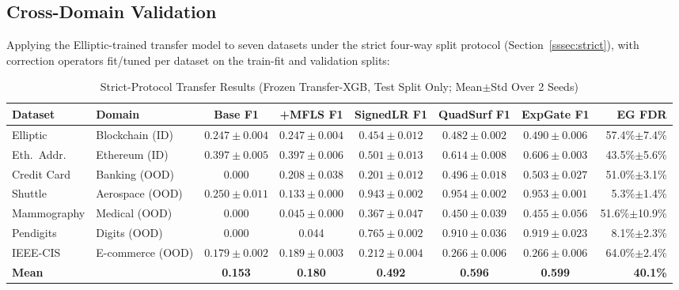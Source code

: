 \documentclass[journal]{IEEEtran}
\begin{document}
\subsection{Cross-Domain Validation}
\label{ssec:crossdomain}

Applying the Elliptic-trained transfer model to seven datasets under the strict four-way split protocol (Section~\ref{sssec:strict}), with correction operators fit/tuned per dataset on the train-fit and validation splits:

\begin{table}[!t]
\centering
\caption{Strict-Protocol Transfer Results (Frozen Transfer-XGB, Test Split Only; Mean$\pm$Std Over 2 Seeds)}
\label{tab:strict_transfer}
\setlength{\tabcolsep}{3pt}
\begin{tabular}{@{}llcccccr@{}}
\toprule
\textbf{Dataset} & \textbf{Domain} & \textbf{Base F1} & \textbf{+MFLS F1} & \textbf{SignedLR F1} & \textbf{QuadSurf F1} & \textbf{ExpGate F1} & \textbf{EG FDR} \\
\midrule
Elliptic     & Blockchain (ID)  & $0.247\pm0.004$ & $0.247\pm0.004$ & $0.454\pm0.012$ & $0.482\pm0.002$ & $0.490\pm0.006$ & 57.4\%$\pm$7.4\% \\
Eth.\ Addr.  & Ethereum (ID)    & $0.397\pm0.005$ & $0.397\pm0.006$ & $0.501\pm0.013$ & $0.614\pm0.008$ & $0.606\pm0.003$ & 43.5\%$\pm$5.6\% \\
Credit Card  & Banking (OOD)    & 0.000            & $0.208\pm0.038$ & $0.201\pm0.012$ & $0.496\pm0.018$ & $0.503\pm0.027$ & 51.0\%$\pm$3.1\% \\
Shuttle      & Aerospace (OOD)  & $0.250\pm0.011$ & $0.133\pm0.000$ & $0.943\pm0.002$ & $0.954\pm0.002$ & $0.953\pm0.001$ & 5.3\%$\pm$1.4\% \\
Mammography  & Medical (OOD)    & 0.000            & $0.045\pm0.000$ & $0.367\pm0.047$ & $0.450\pm0.039$ & $0.455\pm0.056$ & 51.6\%$\pm$10.9\% \\
Pendigits    & Digits (OOD)     & 0.000            & 0.044            & $0.765\pm0.002$ & $0.910\pm0.036$ & $0.919\pm0.023$ & 8.1\%$\pm$2.3\% \\
IEEE-CIS     & E-commerce (OOD) & $0.179\pm0.002$ & $0.189\pm0.003$ & $0.212\pm0.004$ & $0.266\pm0.006$ & $0.266\pm0.006$ & 64.0\%$\pm$2.4\% \\
\midrule
\textbf{Mean} &                  & \textbf{0.153}   & \textbf{0.180}   & \textbf{0.492}   & \textbf{0.596}   & \textbf{0.599}   & \textbf{40.1\%} \\
\bottomrule
\end{tabular}
\end{table}
\end{document}
